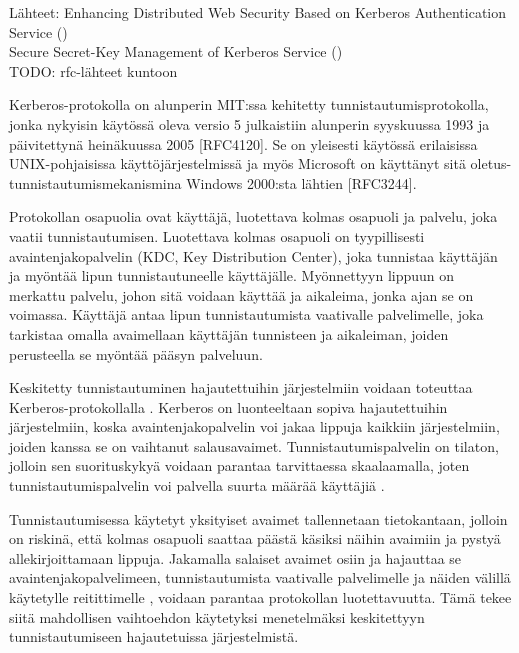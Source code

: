 Lähteet:
Enhancing Distributed Web Security Based on Kerberos Authentication Service (\cite{enchancing_distributed_web_security})\\
Secure Secret-Key Management of Kerberos Service (\cite{secure_secret_key})\\
TODO: rfc-lähteet kuntoon

Kerberos-protokolla on alunperin MIT:ssa kehitetty tunnistautumisprotokolla, jonka nykyisin käytössä oleva versio 5 julkaistiin alunperin syyskuussa 1993 ja päivitettynä heinäkuussa 2005 [RFC4120]. Se on yleisesti käytössä erilaisissa UNIX-pohjaisissa käyttöjärjestelmissä ja myös Microsoft on käyttänyt sitä oletus-tunnistautumismekanismina Windows 2000:sta lähtien [RFC3244].

Protokollan osapuolia ovat käyttäjä, luotettava kolmas osapuoli ja palvelu, joka vaatii tunnistautumisen. Luotettava kolmas osapuoli on tyypillisesti avaintenjakopalvelin (KDC, Key Distribution Center), joka tunnistaa käyttäjän ja myöntää lipun tunnistautuneelle käyttäjälle. Myönnettyyn lippuun on merkattu palvelu, johon sitä voidaan käyttää ja aikaleima, jonka ajan se on voimassa. Käyttäjä antaa lipun tunnistautumista vaativalle palvelimelle, joka tarkistaa omalla avaimellaan käyttäjän tunnisteen ja aikaleiman, joiden perusteella se myöntää pääsyn palveluun.

Keskitetty tunnistautuminen hajautettuihin järjestelmiin voidaan toteuttaa Kerberos-protokollalla \cite{enchancing_distributed_web_security}. Kerberos on luonteeltaan sopiva hajautettuihin järjestelmiin, koska avaintenjakopalvelin voi jakaa lippuja kaikkiin järjestelmiin, joiden kanssa se on vaihtanut salausavaimet. Tunnistautumispalvelin on tilaton, jolloin sen suorituskykyä voidaan parantaa tarvittaessa skaalaamalla, joten tunnistautumispalvelin voi palvella suurta määrää käyttäjiä \cite{enchancing_distributed_web_security}.

Tunnistautumisessa käytetyt yksityiset avaimet tallennetaan tietokantaan, jolloin on riskinä, että kolmas osapuoli saattaa päästä käsiksi näihin avaimiin ja pystyä allekirjoittamaan lippuja. Jakamalla salaiset avaimet osiin ja hajauttaa se avaintenjakopalvelimeen, tunnistautumista vaativalle palvelimelle ja näiden välillä käytetylle reitittimelle \cite{secure_secret_key}, voidaan parantaa protokollan luotettavuutta. Tämä tekee siitä mahdollisen vaihtoehdon käytetyksi menetelmäksi keskitettyyn tunnistautumiseen hajautetuissa järjestelmistä.
